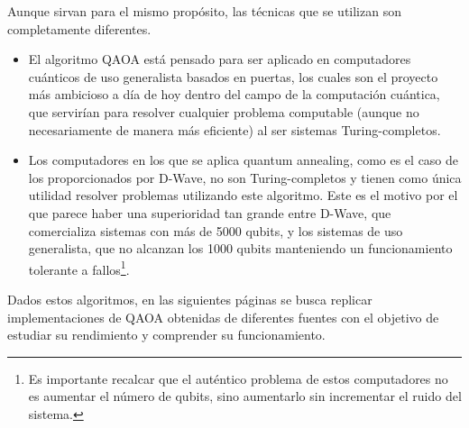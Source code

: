 Aunque sirvan para el mismo propósito, las técnicas que se utilizan son completamente diferentes.

\begin{itemize}
\item El algoritmo QAOA está pensado para ser aplicado en computadores cuánticos de uso generalista basados en puertas, los cuales son el proyecto más ambicioso a día de hoy dentro del campo de la computación cuántica, que servirían para resolver cualquier problema computable (aunque no necesariamente de manera más eficiente) al ser sistemas Turing-completos.
\item Los computadores en los que se aplica quantum annealing, como es el caso de los proporcionados por D-Wave,  %
  no son Turing-completos y tienen como única utilidad resolver problemas utilizando este algoritmo.
  Este es el motivo por el que parece haber una superioridad tan grande entre D-Wave, que comercializa sistemas con más de 5000 qubits, y los sistemas de uso generalista, que no alcanzan los 1000 qubits manteniendo un funcionamiento tolerante a fallos\footnote{Es importante recalcar que el auténtico problema de estos computadores no es aumentar el número de qubits, sino aumentarlo sin incrementar el ruido del sistema.}.
\end{itemize}

Dados estos algoritmos, en las siguientes páginas se busca replicar implementaciones de QAOA obtenidas de diferentes fuentes con el objetivo de estudiar su rendimiento y comprender su funcionamiento.

